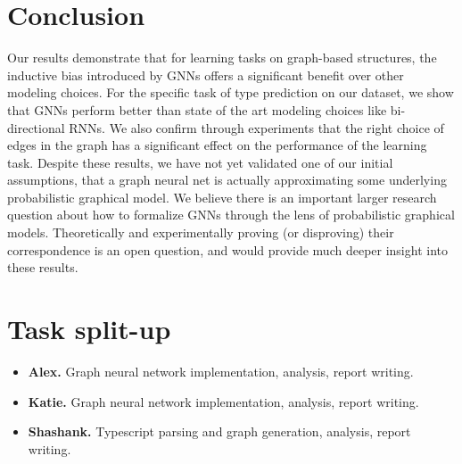 \section{Conclusion}
\label{sec:conclusions}

Our results demonstrate that for learning tasks on graph-based structures, the inductive bias introduced by GNNs offers a significant benefit over other modeling choices.
For the specific task of type prediction on our dataset, we show that GNNs perform better than state of the art modeling choices like bi-directional RNNs.
We also confirm through experiments that the right choice of edges in the graph has a significant effect on the performance of the learning task.
Despite these results, we have not yet validated one of our initial assumptions, that a graph neural net is actually approximating some underlying probabilistic graphical model.
We believe there is an important larger research question about how to formalize GNNs through the lens of probabilistic graphical models.
Theoretically and experimentally proving (or disproving) their correspondence is an open question, and would provide much deeper insight into these results.

\section{Task split-up}
\begin{itemize}[]
	\item \textbf{Alex.} Graph neural network implementation, analysis, report writing.
	\item \textbf{Katie.} Graph neural network implementation, analysis, report writing.
	\item \textbf{Shashank.} Typescript parsing and graph generation, analysis, report writing.
\end{itemize}
